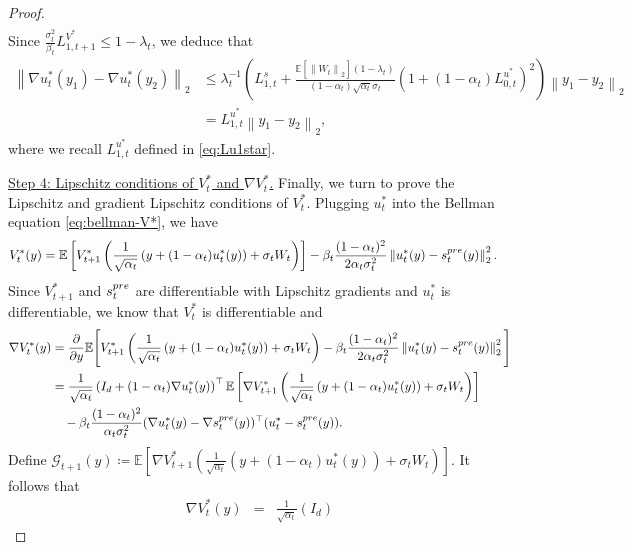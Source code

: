 \documentclass[10pt,a4paper]{amsart}
\newcommand{\bracket}[1]{\left[ #1 \right]}
\newcommand{\parenthesis}[1]{\left( #1 \right)}
\newcommand{\norm}[1]{\left \|#1\right \|}
\newcommand{\E}{\mathbb{E}}
\begin{document}
\begin{proof}
\begin{align*}
\end{align*}
Since $ \frac{\sigma_{t}^{2}}{\beta_{t}}L_{1, t+1}^{V^{*}} \leq 1 - \lambda_{t} $, we deduce that
\begin{align*}
    \norm{\nabla u_{t}^{*}(y_{1}) - \nabla u_{t}^{*}(y_{2})}_2 & \leq \lambda_{t}^{-1}\parenthesis{L_{1, t}^{s} +  \frac{\E\bracket{\norm{W_{t}}_2}(1 - \lambda_t)}{(1 - \alpha_t)\sqrt{\alpha_{t}}\sigma_{t}}\parenthesis{1 + (1 - \alpha_{t})L_{0,t}^{u^{*}}}^{2}}\norm{y_1 - y_2}_2 \\ &  = L_{1, t}^{u^*}\norm{y_1 - y_2}_2,
\end{align*}
where we recall $L_{1, t}^{u^*}$ defined in \eqref{eq:Lu1star}.


\underline{Step 4: Lipschitz conditions of $ V_{t}^{*} $ and $ \nabla V_{t}^{*}$.} Finally, we turn to prove the Lipschitz and gradient Lipschitz conditions of $V_t^*$. Plugging $u_t^*$ into the Bellman equation \eqref{eq:bellman-V*}, we have
\begin{align}\label{eq:bellman-u*}
 V_t^*(y) & = \E\bracket{V^{*}_{t+1}\left(\frac{1}{\sqrt{\alpha_t}}\parenthesis{y + (1 - \alpha_t)u_t^*(y)} + \sigma_t W_t\right)} - \beta_t \frac{(1 - \alpha_{t})^{2}}{2\alpha_{t}\sigma_{t}^{2}}\norm{u_t^*(y) - s^{\rm pre}_{t}(y)}_{2}^{2}.
\end{align}
Since $V_{t+1}^*$ and $s_t^{\rm pre}$ are differentiable with Lipschitz gradients and $u_t^*$ is differentiable, we know that $V_{t}^{*}$ is differentiable and 
\begin{align*}
 \nabla V_t^*(y) &= \frac{\partial}{\partial y} \E\Bigg[V^{*}_{t+1}\left(\frac{1}{\sqrt{\alpha_t}}\parenthesis{y + (1 - \alpha_t)u_t^*(y)} + \sigma_t W_t\right)- \beta_t \frac{(1 - \alpha_{t})^{2}}{2\alpha_{t}\sigma_{t}^{2}}\norm{u_t^*(y) - s^{\rm pre}_{t}(y)}_{2}^{2}\Bigg]  \\
 &= \frac{1}{\sqrt{\alpha_t}}\parenthesis{I_d 
 + (1 - \alpha_t) \nabla u_t^*(y)}^\top\E\bracket{\nabla V_{t+1}^{*}\left(\frac{1}{\sqrt{\alpha_t}}\parenthesis{y + (1 - \alpha_t)u_t^*(y)} + \sigma_t W_t\right)}\\
 & \quad - \beta_t \frac{(1 - \alpha_{t})^{2}}{\alpha_{t}\sigma_{t}^{2}}(\nabla u_t^*(y) - \nabla s^{\rm pre}_{t}(y))^\top(u_t^* - s^{\rm pre}_{t}(y)).
\end{align*}
Define $\mathcal{G}_{t+1}(y) \coloneqq \E\bracket{\nabla V_{t+1}^{*}\left(\frac{1}{\sqrt{\alpha_t}}\parenthesis{y + (1 - \alpha_t)u_t^*(y)} + \sigma_t W_t\right)} $. It follows that 
\begin{eqnarray} 
 \nabla V_t^*(y) 
 &=&\frac{1}{\sqrt{\alpha_t}}\parenthesis{I_d 
}
\end{eqnarray}
\end{proof}
\end{document}

